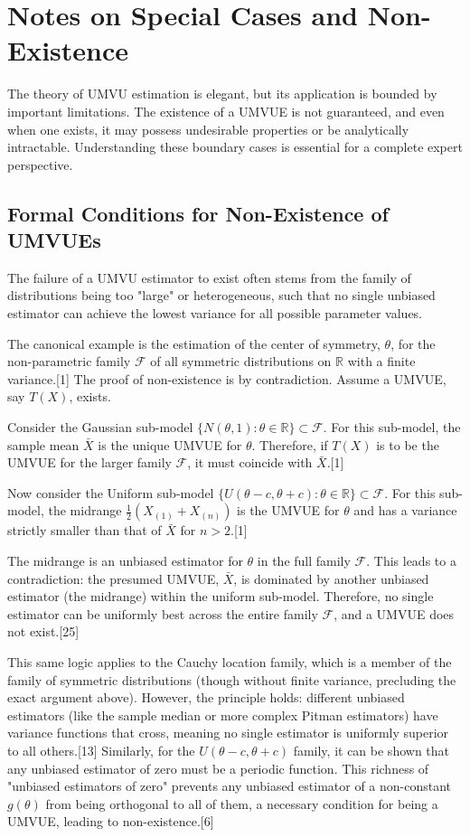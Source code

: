 \documentclass[11pt, letterpaper]{article}
\begin{document}
\section*{Notes on Special Cases and Non-Existence}
The theory of UMVU estimation is elegant, but its application is bounded by important limitations. The existence of a UMVUE is not guaranteed, and even when one exists, it may possess undesirable properties or be analytically intractable. Understanding these boundary cases is essential for a complete expert perspective.

\subsection*{Formal Conditions for Non-Existence of UMVUEs}
The failure of a UMVU estimator to exist often stems from the family of distributions being too "large" or heterogeneous, such that no single unbiased estimator can achieve the lowest variance for all possible parameter values.

The canonical example is the estimation of the center of symmetry, $\theta$, for the non-parametric family $\mathcal{F}$ of all symmetric distributions on $\mathbb{R}$ with a finite variance.[1] The proof of non-existence is by contradiction. Assume a UMVUE, say $T(X)$, exists.

Consider the Gaussian sub-model $\{N(\theta,1):\theta \in \mathbb{R}\} \subset \mathcal{F}$. For this sub-model, the sample mean $\bar{X}$ is the unique UMVUE for $\theta$. Therefore, if $T(X)$ is to be the UMVUE for the larger family $\mathcal{F}$, it must coincide with $\bar{X}$.[1]

Now consider the Uniform sub-model $\{U(\theta-c, \theta+c): \theta \in \mathbb{R}\} \subset \mathcal{F}$. For this sub-model, the midrange $\frac{1}{2}(X_{(1)} + X_{(n)})$ is the UMVUE for $\theta$ and has a variance strictly smaller than that of $\bar{X}$ for $n>2$.[1]

The midrange is an unbiased estimator for $\theta$ in the full family $\mathcal{F}$. This leads to a contradiction: the presumed UMVUE, $\bar{X}$, is dominated by another unbiased estimator (the midrange) within the uniform sub-model. Therefore, no single estimator can be uniformly best across the entire family $\mathcal{F}$, and a UMVUE does not exist.[25]

This same logic applies to the Cauchy location family, which is a member of the family of symmetric distributions (though without finite variance, precluding the exact argument above). However, the principle holds: different unbiased estimators (like the sample median or more complex Pitman estimators) have variance functions that cross, meaning no single estimator is uniformly superior to all others.[13] Similarly, for the $U(\theta-c, \theta+c)$ family, it can be shown that any unbiased estimator of zero must be a periodic function. This richness of "unbiased estimators of zero" prevents any unbiased estimator of a non-constant $g(\theta)$ from being orthogonal to all of them, a necessary condition for being a UMVUE, leading to non-existence.[6]
\end{document}

